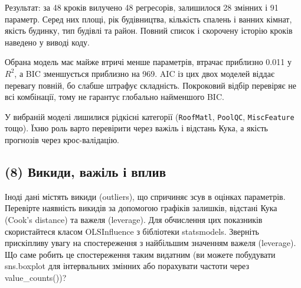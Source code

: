 Результат: за 48 кроків вилучено 48 регресорів, залишилося 28 змінних і
91 параметр. Серед них площі, рік будівництва, кількість спалень і
ванних кімнат, якість будинку, тип будівлі та район. Повний список і
скорочену історію кроків наведено у виводі коду.

Обрана модель має майже втричі менше параметрів, втрачає приблизно 0.011
у \(R^2\), а BIC зменшується приблизно на 969. AIC із цих двох моделей
віддає перевагу повній, бо слабше штрафує складність. Покроковий відбір
перевіряє не всі комбінації, тому не гарантує глобально найменшого BIC.

У вибраній моделі лишилися рідкісні категорії (\texttt{RoofMatl},
\texttt{PoolQC}, \texttt{MiscFeature} тощо). Їхню роль варто перевірити
через важіль і відстань Кука, а якість прогнозів через крос-валідацію.


\Needspace{238.0pt}

\subsection{(8) Викиди, важіль і вплив}

\begin{taskstatement}
Іноді дані містять викиди (outliers), що спричиняє зсув в оцінках
параметрів. Перевірте наявність викидів за допомогою графіків залишків,
відстані Кука (Cook's distance) та важеля (leverage). Для обчислення цих
показників скористайтеся класом OLSInfluence з бібліотеки statsmodels.
Зверніть прискіпливу увагу на спостереження з найбільшим значенням
важеля (leverage). Що саме робить це спостереження таким видатним (ви
можете побудувати sns.boxplot для інтервальних змінних або порахувати
частоти через value\_counts())?
\end{taskstatement}



\Needspace{28.4pt}


